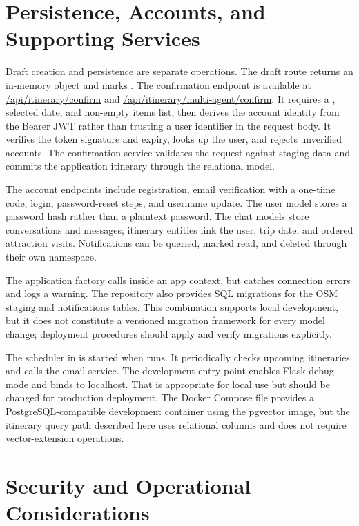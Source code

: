 \section{Persistence, Accounts, and Supporting Services}

Draft creation and persistence are separate operations. The draft route returns an in-memory object and marks . The confirmation endpoint is available at \url{/api/itinerary/confirm} and \url{/api/itinerary/multi-agent/confirm}. It requires a , selected date, and non-empty items list, then derives the account identity from the Bearer JWT rather than trusting a user identifier in the request body. It verifies the token signature and expiry, looks up the user, and rejects unverified accounts. The confirmation service validates the request against staging data and commits the application itinerary through the relational model.

The account endpoints include registration, email verification with a one-time code, login, password-reset steps, and username update. The user model stores a password hash rather than a plaintext password. The chat models store conversations and messages; itinerary entities link the user, trip date, and ordered attraction visits. Notifications can be queried, marked read, and deleted through their own namespace.

The application factory calls  inside an app context, but catches connection errors and logs a warning. The repository also provides SQL migrations for the OSM staging and notifications tables. This combination supports local development, but it does not constitute a versioned migration framework for every model change; deployment procedures should apply and verify migrations explicitly.

The scheduler in  is started when  runs. It periodically checks upcoming itineraries and calls the email service. The development entry point enables Flask debug mode and binds to localhost. That is appropriate for local use but should be changed for production deployment. The Docker Compose file provides a PostgreSQL-compatible development container using the pgvector image, but the itinerary query path described here uses relational columns and does not require vector-extension operations.

\section{Security and Operational Considerations}

